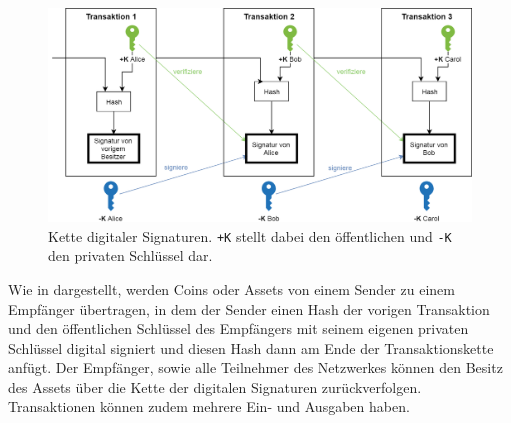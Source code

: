     \begin{figure}[H]
    	\centering
    	\includegraphics[width=\textwidth]{graphics/transaction.png}
    	\caption[Kette digitaler Signaturen]{Kette digitaler Signaturen\cite{Nakamoto2008}. \lstinline{+K} stellt dabei den öffentlichen und \lstinline{-K} den privaten Schlüssel dar.}
    	\label{fig:txio}
    \end{figure}
    Wie in  dargestellt, werden Coins oder Assets von einem Sender zu einem Empfänger übertragen, in dem der Sender einen Hash der vorigen Transaktion und den öffentlichen Schlüssel des Empfängers mit seinem eigenen privaten Schlüssel digital signiert und diesen Hash dann am Ende der Transaktionskette anfügt.
    Der Empfänger, sowie alle Teilnehmer des Netzwerkes können den Besitz des Assets über die Kette der digitalen Signaturen zurückverfolgen.
    Transaktionen können zudem mehrere Ein- und Ausgaben haben.\cite{Nakamoto2008}
    
